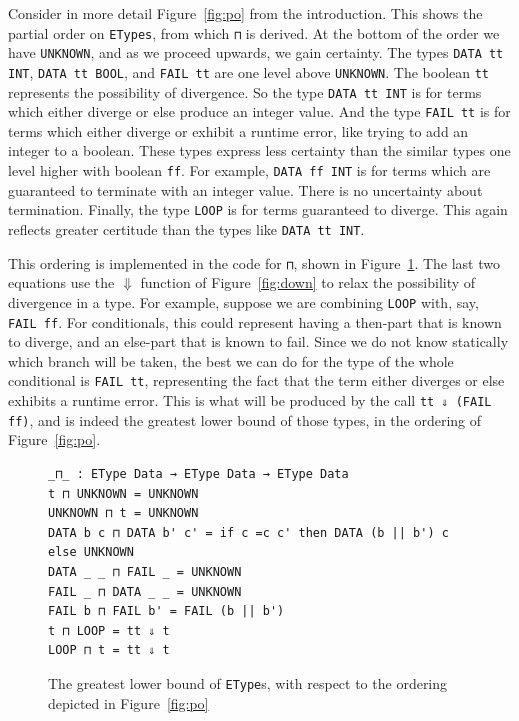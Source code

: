\documentclass[acmsmall,screen,review]{acmart}
\begin{document}
Consider in more detail Figure~\ref{fig:po} from the introduction.
This shows the partial order on \verb|ETypes|, from which \verb|⊓| is
derived.  At the bottom of the order we have \verb|UNKNOWN|, and as we
proceed upwards, we gain certainty.  The types \verb|DATA tt INT|,
\verb|DATA tt BOOL|, and \verb|FAIL tt| are one level above
\verb|UNKNOWN|.  The boolean \verb|tt| represents the possibility of
divergence.  So the type \verb|DATA tt INT| is for terms which either
diverge or else produce an integer value.  And the type \verb|FAIL tt|
is for terms which either diverge or exhibit a runtime error, like
trying to add an integer to a boolean.  These types express less
certainty than the similar types one level higher with boolean
\verb|ff|.  For example, \verb|DATA ff INT| is for terms which are
guaranteed to terminate with an integer value.  There is no
uncertainty about termination.  Finally, the type \verb|LOOP| is for
terms guaranteed to diverge.  This again reflects greater certitude
than the types like \verb|DATA tt INT|.

This ordering is implemented in the code for \verb|⊓|, shown in
Figure~\ref{fig:glb}.  The last two equations use the $\Downarrow$
function of Figure~\ref{fig:down} to relax the possibility of
divergence in a type.  For example, suppose we are combining
\verb|LOOP| with, say, \verb|FAIL ff|.  For conditionals, this could
represent having a then-part that is known to diverge, and an
else-part that is known to fail.  Since we do not know statically
which branch will be taken, the best we can do for the type of the
whole conditional is \verb|FAIL tt|, representing the fact that the
term either diverges or else exhibits a runtime error.  This is what
will be produced by the call \verb|tt ⇓ (FAIL ff)|, and is indeed the
greatest lower bound of those types, in the ordering of
Figure~\ref{fig:po}.

\begin{figure}
\begin{verbatim}
_⊓_ : EType Data → EType Data → EType Data
t ⊓ UNKNOWN = UNKNOWN
UNKNOWN ⊓ t = UNKNOWN
DATA b c ⊓ DATA b' c' = if c =c c' then DATA (b || b') c else UNKNOWN
DATA _ _ ⊓ FAIL _ = UNKNOWN
FAIL _ ⊓ DATA _ _ = UNKNOWN
FAIL b ⊓ FAIL b' = FAIL (b || b')
t ⊓ LOOP = tt ⇓ t
LOOP ⊓ t = tt ⇓ t
\end{verbatim}
\caption{The greatest lower bound of \texttt{EType}s, with respect to the ordering depicted in Figure~\ref{fig:po}}
\label{fig:glb}
\end{figure}
\end{document}

